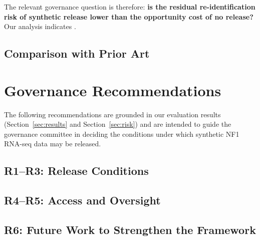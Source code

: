 The relevant governance question is therefore:
\textbf{is the residual re-identification risk of synthetic release lower
than the opportunity cost of no release?}
Our analysis indicates .

\subsection{Comparison with Prior Art}



\section{Governance Recommendations}
\label{sec:governance}

The following recommendations are grounded in our evaluation results
(Section~\ref{sec:results} and Section~\ref{sec:risk}) and are intended
to guide the governance committee in deciding the conditions under which
synthetic NF1 RNA-seq data may be released.

\subsection{R1--R3: Release Conditions}



\subsection{R4--R5: Access and Oversight}



\subsection{R6: Future Work to Strengthen the Framework}


